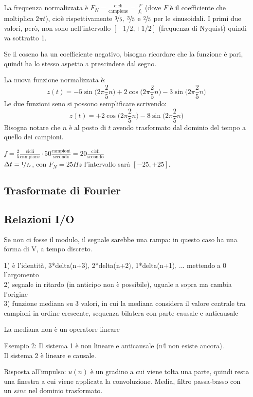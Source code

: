 La frequenza normalizzata è $F_N = \frac{\text{cicli}}{\text{campione}} = \frac{F}{f_c}$ (dove $F$ è il coefficiente che moltiplica $2\pi t$), cioè rispettivamente $\nicefrac{3}{5}$, $\nicefrac{3}{5}$ e $\nicefrac{2}{5}$ per le sinusoidali. I primi due valori, però, non sono nell'intervallo $[-1/2, +1/2]$ (frequenza di Nyquist) quindi va sottratto 1. 

Se il coseno ha un coefficiente negativo, bisogna ricordare che la funzione è pari, quindi ha lo stesso aspetto a prescindere dal segno.

La nuova funzione normalizzata è:
$$z(t) = -5\sin\Big(2\pi \frac{2}{5}n\Big) + 2\cos\Big(2\pi \frac{2}{5}n\Big) - 3\sin\Big(2\pi \frac{2}{5}n\Big)$$
Le due funzioni seno si possono semplificare scrivendo: 
$$z(t) = +2\cos\Big(2\pi \frac{2}{5}n\Big) - 8\sin\Big(2\pi \frac{2}{5}n\Big)$$
Bisogna notare che $n$ è al posto di $t$ avendo trasformato dal dominio del tempo a quello dei campioni. 

$f = \frac{2}{5} \frac{\text{cicli}}{\text{campione}} \cdot 50 \frac{\text{campioni}}{\text{secondo}} = 20 \frac{\text{cicli}}{\text{secondo}}$ \\
$\Delta t = \nicefrac{1}{f_c}$, con $F_N = 25Hz$ l'intervallo sarà $[-25, +25]$.

\subsection{Trasformate di Fourier}
\subsubsection{}

\subsection{Relazioni I/O}
Se non ci fosse il modulo, il segnale sarebbe una rampa: in questo caso ha una forma di V, a tempo discreto. 

1) è l'identità, 3*delta(n+3), 2*delta(n+2), 1*delta(n+1), ... mettendo a 0 l'argomento \\
2) segnale in ritardo (in anticipo non è possibile), uguale a sopra ma cambia l'origine \\
3) funzione mediana su 3 valori, in cui la mediana considera il valore centrale tra campioni in ordine crescente, sequenza bilatera con parte causale e anticausale

La mediana non è un operatore lineare


Esempio 2:
Il sistema 1 è non lineare e anticausale (n\^4 non esiste ancora). \\
Il sistema 2 è lineare e causale.


Risposta all'impulso: $u(n)$ è un gradino a cui viene tolta una parte, quindi resta una finestra a cui viene applicata la convoluzione. Media, filtro passa-basso con un $sinc$ nel dominio trasformato.






